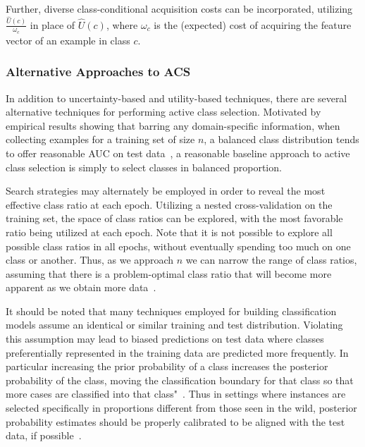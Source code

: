Further, diverse class-conditional acquisition costs can be incorporated, utilizing $\frac{\hat{U}(c)}{\omega_c}$ in place of $\hat{U}(c)$, where $\omega_c$ is the (expected) cost of acquiring the feature vector of an example in class $c$.\\


\subsubsection{ Alternative Approaches to ACS}
In addition to uncertainty-based and utility-based techniques, there are several alternative techniques for performing active class selection. Motivated by empirical results showing that barring any domain-specific information, when collecting examples for a training set of size $n$, a balanced class distribution tends to offer reasonable AUC on test data~\cite{WeissProvost2001, WeissProvost2003}, a reasonable baseline approach to active class selection is simply to select classes in balanced proportion.


Search strategies may alternately be employed in order to reveal the most effective class ratio at each epoch. Utilizing a nested cross-validation on the training set, the space of class ratios can be explored, with the most favorable ratio being utilized at each epoch.
Note that it is not possible to explore all possible class ratios in all epochs, without eventually spending too much on one class or another.
Thus, as we approach $n$ we can narrow the range of class ratios,
assuming that there is a problem-optimal class ratio that will become more apparent as we obtain more data~\cite{WeissProvost2003}.

It should be noted that many techniques employed for building classification models assume an identical or similar training and test distribution. Violating this assumption may lead to biased predictions on test data where classes preferentially represented in the training data are predicted more frequently. In particular increasing the prior probability of a class increases the posterior probability of the class, moving the classification boundary for that class so that more cases are classified into that class"~\cite{sasguide,provost2000}. Thus in settings where instances are selected specifically in proportions different from those seen in the wild, posterior probability estimates should be properly calibrated to be aligned with the test data, if possible~\cite{provost2000,Elkan01thefoundations,WeissProvost2003}.


